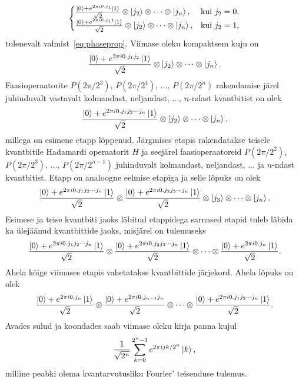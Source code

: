 \documentclass[12pt]{report}
\def\ket#1{\left|#1\right>}
\begin{document}
\begin{align}
    \begin{cases}
        \frac{\ket{0} + e^{2\pi i0.j_1}\ket{1}}{\sqrt{2}} \otimes \ket{j_2} \otimes \cdots \otimes \ket{j_n}\text{,} & \text{kui \(j_2 = 0\)} \rlap{,} \\
        \frac{\ket{0} + e^{2\pi i0.j_11}\ket{1}}{\sqrt{2}} \otimes \ket{j_2} \otimes \cdots \otimes \ket{j_n}\text{,} & \text{kui \(j_2 = 1\)} \rlap{,} \\
    \end{cases}
\end{align}
tulenevalt valmist~\eqref{eq:phaseprop}.
Viimase oleku kompaktsem kuju on
\begin{align}
    \frac{\ket{0} + e^{2\pi i0.j_1j_2}\ket{1}}{\sqrt{2}} \otimes \ket{j_2} \otimes \cdots \otimes \ket{j_n} \rlap{.}
\end{align}
Faasioperaatorite \(P(2\pi/2^3)\), \(P(2\pi/2^4)\), \(\ldots\), \(P(2\pi/2^n)\) rakendamise järel juhinduvalt vastavalt kolmandast, neljandast, \(\ldots\), \(n\)-ndast kvantbitist on olek
\begin{align}
   \frac{\ket{0} + e^{2\pi i0.j_1j_2\cdots j_n}\ket{1}}{\sqrt{2}} \otimes \ket{j_2} \otimes \cdots \otimes \ket{j_n} \rlap{,}
\end{align}
millega on esimene etapp lõppenud.
Järgmises etapis rakendatakse teisele kvantbitile Hadamardi operaatorit \(H\) ja seejärel faasioperaatoreid \(P(2\pi/2^2)\), \(P(2\pi/2^3)\), \(\ldots\), \(P(2\pi/2^{n-1})\) juhinduvalt kolmandast, neljandast, \(\ldots\) ja \(n\)-ndast kvantbitist.
Etapp on analoogne eelmise etapiga ja selle lõpuks on olek
\begin{align}
    \frac{\ket{0} + e^{2\pi i0.j_1j_2\cdots j_n}\ket{1}}{\sqrt{2}}
    \otimes \frac{\ket{0} + e^{2\pi i0.j_2j_3\cdots j_n}\ket{1}}{\sqrt{2}}
    \otimes \ket{j_3} \otimes \cdots \otimes \ket{j_n} \rlap{.}
\end{align}
Esimese ja teise kvantbiti jaoks läbitud etappidega sarnased etapid tuleb läbida ka ülejäänud kvantbittide jaoks, misjärel on tulemuseks
\begin{align}
    \frac{\ket{0} + e^{2\pi i0.j_1j_2\cdots j_n}\ket{1}}{\sqrt{2}}
    \otimes \frac{\ket{0} + e^{2\pi i0.j_2j_3\cdots j_n}\ket{1}}{\sqrt{2}}
    \otimes \cdots
    \otimes \frac{\ket{0} + e^{2\pi i0.j_n}\ket{1}}{\sqrt{2}} \rlap{.}
\end{align}
Ahela kõige viimases etapis vahetatakse kvantbittide järjekord.
Ahela lõpuks on olek
\begin{align}\label{f:qftfinal}
    \frac{\ket{0} + e^{2\pi i0.j_n}\ket{1}}{\sqrt{2}}
    \otimes \frac{\ket{0} + e^{2\pi i0.j_{n-1}j_n}}{\sqrt{2}}
    \otimes \cdots
    \otimes \frac{\ket{0} + e^{2\pi i0.j_1j_2\cdots j_n}\ket{1}}{\sqrt{2}} \rlap{.}
\end{align}
Avades sulud ja koondades saab viimase oleku kirja panna kujul
\begin{equation}\label{f:qftfinaltrans}
    \frac{1}{\sqrt{2^n}}\sum_{k=0}^{2^n-1}e^{2\pi ijk/2^n}\ket k \rlap{,}
\end{equation}
milline peabki olema kvantarvutusliku Fourier' teisenduse tulemus.
\end{document}
